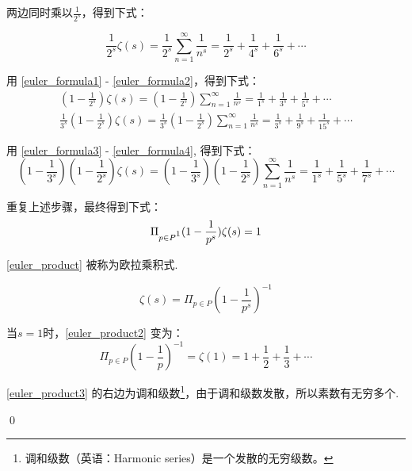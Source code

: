 \documentclass[UTF8]{ctexart}
\begin{document}
两边同时乘以$\frac{1}{2^s}$，得到下式：

\begin{equation}
	\frac{1}{2^s}\zeta(s) = \frac{1}{2^s}\sum_{n=1}^{\infty}\frac{1}{n^s} = \frac{1}{2^s} + \frac{1} {4^s} + \frac{1}{6^s} + \cdots    \label{euler_formula2}
\end{equation}

用 \eqref{euler_formula1} - \eqref{euler_formula2}，得到下式：
\begin{gather}
	(1 - \frac{1}{2^s})\zeta(s) = (1 - \frac{1}{2^s})\sum_{n=1}^{\infty}\frac{1}{n^s} = \frac{1}{1^s} + \frac{1}{3^s} + \frac{1}{5^s} + \cdots \label{euler_formula3}\\
	\frac{1}{3^s}(1 - \frac{1}{2^s})\zeta(s) = \frac{1}{3^s}(1 - \frac{1}{2^s})\sum_{n=1}^{\infty}\frac{1}{n^s} = \frac{1}{3^s} + \frac{1}{9^s} + \frac{1}{15^s} + \cdots \label{euler_formula4}
\end{gather}

用 \eqref{euler_formula3} - \eqref{euler_formula4}, 得到下式：
\begin{equation}
	(1 - \frac{1}{3^s})(1 - \frac{1}{2^s})\zeta(s) = (1 - \frac{1}{3^s})(1 - \frac{1}{2^s})\sum_{n=1}^{\infty}\frac{1}{n^s} = \frac{1}{1^s} + \frac{1}{5^s} + \frac{1}{7^s} + \cdots \label{euler_formula5}
\end{equation}

重复上述步骤，最终得到下式：
\begin{equation}
	\Pi_{p \in P\footnotemark}(1 - \frac{1}{p^s})\zeta(s) = 1 \label{euler_product}
\end{equation}

\eqref{euler_product} 被称为欧拉乘积式.

\begin{equation}
	\zeta(s) = \Pi_{p \in P}(1 - \frac{1}{p^s})^{-1} \label{euler_product2}
\end{equation}

当$s = 1$时，\eqref{euler_product2} 变为：
\begin{equation}
	\Pi_{p \in P}(1 - \frac{1}{p})^{-1} = \zeta(1) = 1 + \frac{1}{2} + \frac{1}{3} + \cdots \label{euler_product3}
\end{equation}

\eqref{euler_product3} 的右边为调和级数\footnote{调和级数（英语：Harmonic series）是一个发散的无穷级数。}，由于调和级数发散，所以素数有无穷多个.

\qed
\end{document}
